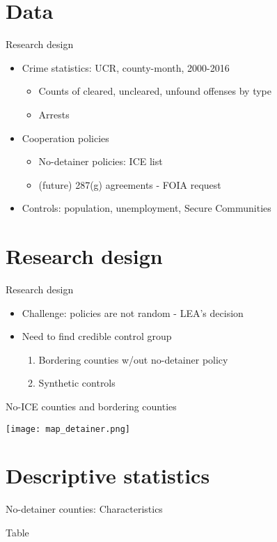\documentclass[xcolor=pdftex,dvipsnames,table]{beamer}
\begin{document}
\section{Data}
\begin{frame}{Research design}
\begin{itemize}
\item Crime statistics: UCR, county-month, 2000-2016
\begin{itemize}
\item Counts of cleared, uncleared, unfound offenses by type
\item Arrests
\end{itemize}
\item Cooperation policies
\begin{itemize}
\item No-detainer policies: ICE list
\item (future) 287(g) agreements - FOIA request
\end{itemize}
\item Controls: population, unemployment, Secure Communities
\end{itemize}
\end{frame}

\section{Research design}
\begin{frame}{Research design}
\begin{itemize}
\item Challenge: policies are not random - LEA's decision
\item Need to find credible control group
\begin{enumerate}
\item Bordering counties w/out no-detainer policy
\item Synthetic controls
\end{enumerate}
\end{itemize}
\end{frame}

\begin{frame}{No-ICE counties and bordering counties}
\begin{center}
\texttt{[image: map\_detainer.png]}
\end{center}
\end{frame}

\section{Descriptive statistics}
\begin{frame}{No-detainer counties: Characteristics}
\begin{center}
Table
\end{center}
\end{frame}
\end{document}
